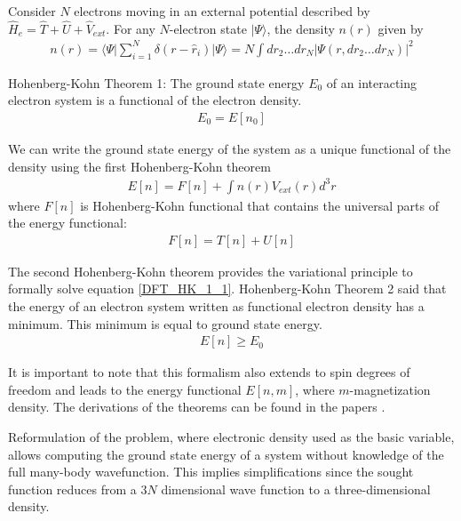 Consider $N$ electrons moving in an external potential described by $\hat{H}_e=\hat{T}+\hat{U}+\hat{V}_{ext}$. For any $N$-electron state $\vert \Psi \rangle$, the density $n(r)$ given by
\begin{align}
n(r)=\langle \Psi \vert \sum_{i=1}^N \delta (r-\hat{r}_i)  \vert \Psi \rangle = N \int dr_2 \ldots dr_N \vert \Psi (r,dr_2 \ldots dr_N) \vert^2 
\label{DFT_electron_density}
\end{align}

Hohenberg-Kohn Theorem 1: The ground state energy $E_0$ of an interacting electron system is a functional of the electron density.
\begin{align}
E_0=E[n_0]
\label{DFT_HK_1}
\end{align}

We can write the ground state energy of the system as a unique functional of the density using the first Hohenberg-Kohn theorem
\begin{align}
E[n]=F[n]+\int n(r) V_{ext}(r) d^3r
\label{DFT_HK_1_1}
\end{align}
where $F[n]$ is Hohenberg-Kohn functional that contains the universal parts of the energy functional:
\begin{align}
F[n]=T[n]+U[n]
\label{DFT_HK_1_2}
\end{align}

The second Hohenberg-Kohn theorem provides the variational principle to formally solve equation \eqref{DFT_HK_1_1}. 
Hohenberg-Kohn Theorem 2 said that the energy of an electron system written as functional electron density has a minimum. This minimum is equal to ground state energy. 
\begin{align}
E[n]\geqslant E_0
\label{DFT_HK_2}
\end{align}

It is important to note that this formalism also extends to spin degrees of freedom and leads to the energy functional $E[n,m]$, where $m$-magnetization density. The derivations of the theorems can be found in the papers \citep{PhysRev.136.B864,PhysRev.140.A1133,Levy6062}.



Reformulation of the problem, where electronic density used as the basic variable, allows computing the
ground state energy of a system without knowledge of the full many-body wavefunction. This implies simplifications since the sought function reduces from a $3N$ dimensional wave function to a three-dimensional density.

